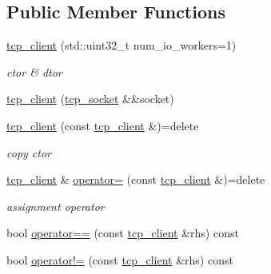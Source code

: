 \subsection*{Public Member Functions}
\begin{DoxyCompactItemize}
\item 
\mbox{\label{classtacopie_1_1tcp__client_a0125e1cf017b0ba0370d682d4382d37b}} 
\hyperlink{classtacopie_1_1tcp__client_a0125e1cf017b0ba0370d682d4382d37b}{tcp\+\_\+client} (std\+::uint32\+\_\+t num\+\_\+io\+\_\+workers=1)
\begin{DoxyCompactList}\small\item\em ctor \& dtor \end{DoxyCompactList}\item 
\hyperlink{classtacopie_1_1tcp__client_a773fbcbb5b79324c8d065e363de73282}{tcp\+\_\+client} (\hyperlink{classtacopie_1_1tcp__socket}{tcp\+\_\+socket} \&\&socket)
\item 
\mbox{\label{classtacopie_1_1tcp__client_a5e326782c52f63814cc8f42a901ffaf6}} 
\hyperlink{classtacopie_1_1tcp__client_a5e326782c52f63814cc8f42a901ffaf6}{tcp\+\_\+client} (const \hyperlink{classtacopie_1_1tcp__client}{tcp\+\_\+client} \&)=delete
\begin{DoxyCompactList}\small\item\em copy ctor \end{DoxyCompactList}\item 
\mbox{\label{classtacopie_1_1tcp__client_aeadcfb8cd727b2917ebcd357311d0a6b}} 
\hyperlink{classtacopie_1_1tcp__client}{tcp\+\_\+client} \& \hyperlink{classtacopie_1_1tcp__client_aeadcfb8cd727b2917ebcd357311d0a6b}{operator=} (const \hyperlink{classtacopie_1_1tcp__client}{tcp\+\_\+client} \&)=delete
\begin{DoxyCompactList}\small\item\em assignment operator \end{DoxyCompactList}\item 
bool \hyperlink{classtacopie_1_1tcp__client_af7a1796c04efd00542349ecab692e073}{operator==} (const \hyperlink{classtacopie_1_1tcp__client}{tcp\+\_\+client} \&rhs) const
\item 
bool \hyperlink{classtacopie_1_1tcp__client_af352b6b1e939c919aec2761517051eb9}{operator!=} (const \hyperlink{classtacopie_1_1tcp__client}{tcp\+\_\+client} \&rhs) const

\end{DoxyCompactItemize}
